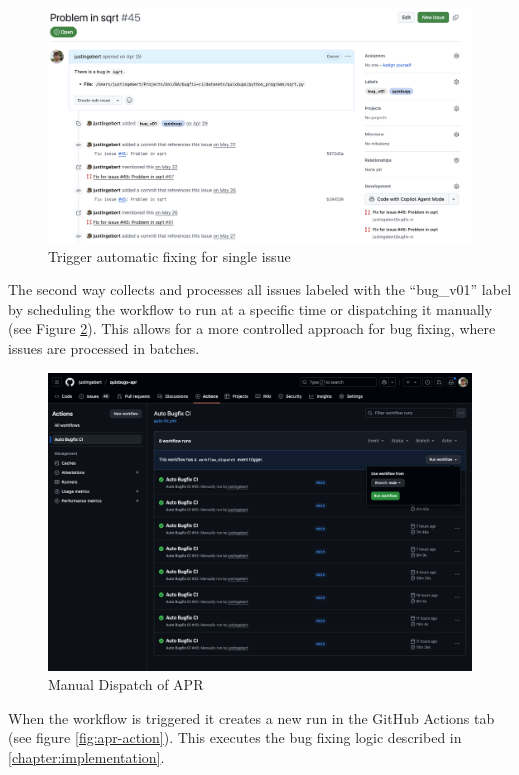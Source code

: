 \begin{figure}[H]
    \centering
    \includegraphics[width=1\textwidth]{images/github/GitHub Issue.png}
    \caption{Trigger automatic fixing for single issue}
    \label{fig:issue-trigger}
\end{figure}

The second way collects and processes all issues labeled with the ``bug\_v01'' label by scheduling the workflow to run at a specific time or dispatching it manually (see Figure \ref{fig:dispatch}). This allows for a more controlled approach for bug fixing, where issues are processed in batches.

\begin{figure}[H]
    \centering
    \includegraphics[width=1\textwidth]{images/workflow/dispatch.png}
    \caption{Manual Dispatch of APR}
    \label{fig:dispatch}
\end{figure}

When the workflow is triggered it creates a new run in the GitHub Actions tab (see figure \ref{fig:apr-action}). This executes the bug fixing logic described in \ref{chapter:implementation}.

